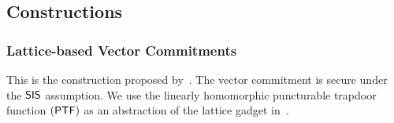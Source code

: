 \subsection{Constructions}

\subsubsection{Lattice-based Vector Commitments}

This is the construction proposed by~\cite{TCC:PeiPepSha21}. The vector commitment is secure under the $\mathsf{SIS}$ assumption. We use the linearly homomorphic puncturable trapdoor function $(\mathsf{PTF})$ as an abstraction of the lattice gadget in~\cite{EC:MicPei12}.

\begin{figure}[ht!]%
	\centering%
	\nicoresetlinenr
\end{figure}
